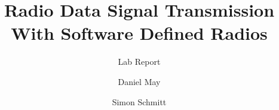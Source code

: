 \documentclass[sigconf]{acmart}
\begin{document}
\title{Radio Data Signal Transmission With Software Defined Radios}

\subtitle{Lab Report}



\author{Daniel May}
\author{Simon Schmitt}

\renewcommand{\shortauthors}{Daniel May \& Simon Schmitt}


\begin{abstract}
%
%  



\end{abstract}
\end{document}
